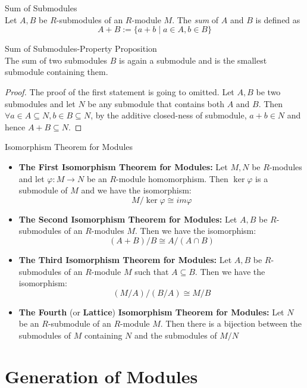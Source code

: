 \begin{definition}{Sum of Submodules}\\
Let $A,B$ be $R$-submodules of an $R$-module $M$. The \textit{sum} of $A$ and $B$ is defined as
$$A+B:= \{a+b \mid a\in A,b\in B\}$$
\end{definition}

\begin{proposition}{Sum of Submodules-Property Proposition}\\
The sum of two submodules $B$ is again a submodule and is the smallest submodule containing them.
\end{proposition}

\begin{proof}
    The proof of the first statement is going to omitted. Let $A,B$ be two submodules and let $N$ be any submodule that contains both $A$ and $B$. Then $\forall a\in A \subseteq N,b\in B \subseteq N$, by the additive closed-ness of submodule, $a+b \in N$ and hence $A+B \subseteq N$.
\end{proof}

\begin{theorem}{Isomorphism Theorem for Modules}
\begin{itemize}
    \item \textbf{The First Isomorphism Theorem for Modules:} Let $M,N$ be $R$-modules and let $\varphi: M\to N$ be an $R$-module homomorphism. Then $\ker \varphi$ is a submodule of $M$ and we have the isomorphism:
    $$M /\ker \varphi \cong im \varphi$$

    \item \textbf{The Second Isomorphism Theorem for Modules:} Let $A,B$ be $R$-submodules of an $R$-modules $M$. Then we have the isomorphism:
    $$(A+B)/B \cong A/(A \cap B)$$

    \item \textbf{The Third Isomorphism Theorem for Modules:} Let $A,B$ be $R$-submodules of an $R$-module $M$ such that $A \subseteq B$. Then we have the isomorphism:
    $$(M/A)/ (B/A) \cong M/B$$

    \item \textbf{The Fourth} (or \textbf{Lattice}) \textbf{Isomorphism Theorem for Modules:} Let $N$ be an $R$-submodule of an $R$-module $M$. Then there is a bijection between the submodules of $M$ containing $N$ and the submodules of $M/N$
\end{itemize}
\end{theorem}

\section{Generation of Modules}

